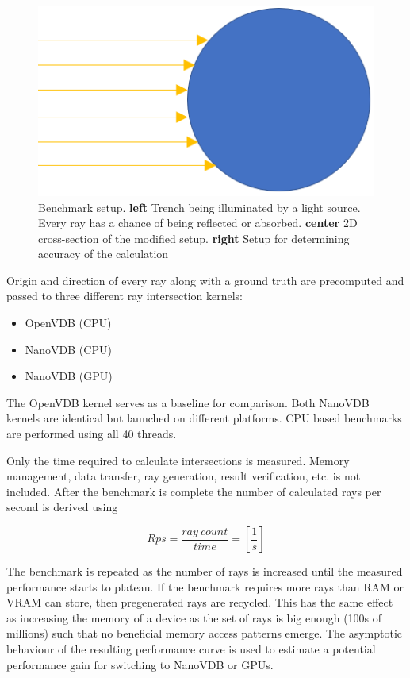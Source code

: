 \begin{figure}[!htb]
	\endminipage\hfill
	\includegraphics[width=\linewidth]{res/rays_on_sphere.png}
	\endminipage

	\caption{Benchmark setup.
		\textbf{left} Trench being illuminated by a light source. Every ray has a chance of being reflected or absorbed.
		\textbf{center} 2D cross-section of the modified setup.
		\textbf{right} Setup for determining accuracy of the calculation
	}
	\label{fig:benchmark_setup}
\end{figure}


Origin and direction of every ray along with a ground truth are precomputed and passed to three different ray intersection kernels:

\begin{itemize}
	\item OpenVDB (CPU)
	\item NanoVDB (CPU)
	\item NanoVDB (GPU)
\end{itemize}

The OpenVDB kernel serves as a baseline for comparison.
Both NanoVDB kernels are identical but launched on different platforms.
CPU based benchmarks are performed using all 40 threads.

Only the time required to calculate intersections is measured. Memory management, data transfer, ray generation, result verification, etc. is not included.
After the benchmark is complete the number of calculated rays per second is derived using

\begin{equation}
	Rps = \frac{ray \: count}{time} = [\frac{1}{s}]
\end{equation}

The benchmark is repeated as the number of rays is increased until the measured performance starts to plateau.
If the benchmark requires more rays than RAM or VRAM can store, then pregenerated rays are recycled.
This has the same effect as increasing the memory of a device as the set of rays is big enough (100s of millions) such that no beneficial memory access patterns emerge.
The asymptotic behaviour of the resulting performance curve is used to estimate a potential performance gain for switching to NanoVDB or GPUs.

